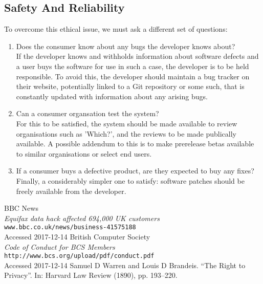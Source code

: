 \documentclass[12pt]{article}
\begin{document}
\subsection{Safety And Reliability}
To overcome this ethical issue, we must ask a different set of questions:
\begin{enumerate}
  \item Does the consumer know about any bugs the developer knows about?\\
        If the developer knows and withholds information about software defects and a user buys the software for use in such a case, the developer is to be held responsible. 
        To avoid this, the developer should maintain a bug tracker on their website, potentially linked to a Git repository or some such, that is constantly updated with information about any arising bugs. 
  \item Can a consumer organsation test the system?\\
        For this to be satisfied, the system should be made available to review organisations such as 'Which?', and the reviews to be made publically available. 
        A possible addendum to this is to make prerelease betas available to similar organisations or select end users. 
  \item If a consumer buys a defective product, are they expected to buy any fixes?\\
        Finally, a considerably simpler one to satisfy: software patches should be freely available from the developer. 
\end{enumerate}

\begin{thebibliography}{9}
      BBC News\\
      \textit{Equifax data hack affected 694,000 UK customers}\\
      \verb|www.bbc.co.uk/news/business-41575188|\\
      Accessed 2017-12-14
      British Computer Society\\
      \textit{Code of Conduct for BCS Members}\\
      \verb|http://www.bcs.org/upload/pdf/conduct.pdf|\\
      Accessed 2017-12-14
      Samuel D Warren and Louis D Brandeis. “The Right to Privacy”. In: Harvard Law Review (1890), pp. 193–220. 


\end{thebibliography}
\end{document}
